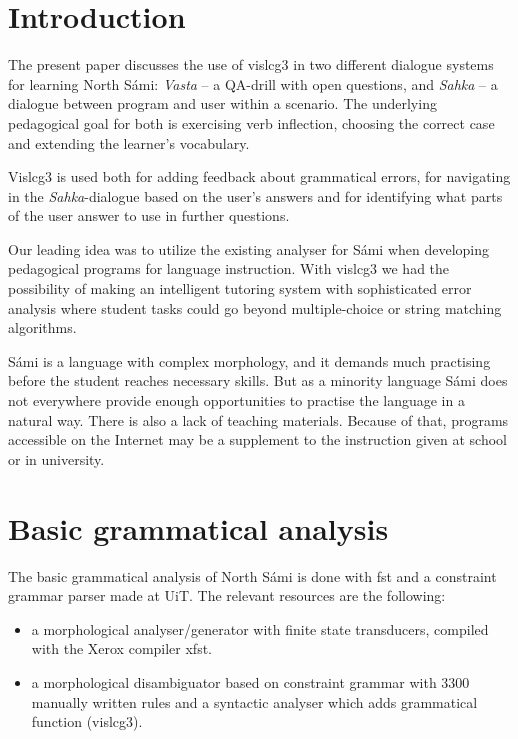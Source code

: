 \documentclass[11pt]{article}
\begin{document}
\section{Introduction} 

The present paper discusses the use of vislcg3 in two different dialogue systems for learning North Sámi: \textit{Vasta} -- a QA-drill with open questions, and \textit{Sahka} -- a  dialogue between program and user within a scenario. The underlying pedagogical goal for both is exercising verb inflection, choosing the correct case and extending the learner's vocabulary. 

Vislcg3 is used both for adding feedback about grammatical errors, for navigating in the \textit{Sahka}-dialogue based on the user's answers and for identifying what parts of the user answer to use in further questions.

Our leading idea was to utilize the existing analyser for Sámi when developing pedagogical programs for language instruction. With vislcg3 we had the possibility of making an intelligent tutoring system with sophisticated error analysis where student tasks could go beyond multiple-choice or string matching algorithms. 

Sámi is a language with complex morphology, and it demands much practising before the student reaches necessary skills. But as a minority language Sámi does not everywhere provide enough opportunities to practise the language in a natural way. There is also a lack of teaching materials. Because of that, programs accessible on the Internet may be a supplement to the instruction given at school or in university. 

\section{Basic grammatical analysis}
The basic grammatical analysis of North Sámi is done with fst and a constraint grammar parser made at UiT. The relevant resources are the following:

\begin{itemize}
\item a morphological analyser/generator with finite state transducers, compiled with the Xerox compiler xfst.  
\item a morphological disambiguator based on constraint grammar with 3300 manually written rules and a syntactic analyser which adds grammatical function (vislcg3). 
\end{itemize}
\end{document}
